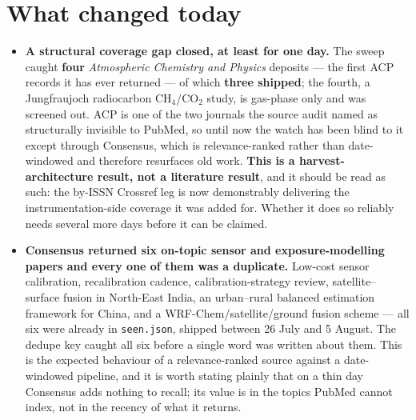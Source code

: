 \documentclass[10pt]{article}
\begin{document}
\section*{\sffamily\bfseries\color{Deep}What changed today}
\vspace{-1.5mm}{\color{Amber}\rule{\linewidth}{1.1pt}}\vspace{2.5mm}

\footnotesize
\begin{itemize}
\item \textbf{A structural coverage gap closed, at least for one day.} The sweep caught
\textbf{four} \textit{Atmospheric Chemistry and Physics} deposits --- the first ACP
records it has ever returned --- of which \textbf{three shipped}; the fourth, a
Jungfraujoch radiocarbon CH$_4$/CO$_2$ study, is gas-phase only and was screened out.
ACP is one of the two journals the source audit named as
structurally invisible to PubMed, so until now the watch has been blind to it except
through Consensus, which is relevance-ranked rather than date-windowed and therefore
resurfaces old work. \textbf{This is a harvest-architecture result, not a literature
result}, and it should be read as such: the by-ISSN Crossref leg is now demonstrably
delivering the instrumentation-side coverage it was added for. Whether it does so
reliably needs several more days before it can be claimed.

\item \textbf{Consensus returned six on-topic sensor and exposure-modelling papers and
every one of them was a duplicate.} Low-cost sensor calibration, recalibration cadence,
calibration-strategy review, satellite--surface fusion in North-East India, an
urban--rural balanced estimation framework for China, and a WRF-Chem/satellite/ground
fusion scheme --- all six were already in \texttt{seen.json}, shipped between 26 July and
5 August. The dedupe key caught all six before a single word was written about them. This
is the expected behaviour of a relevance-ranked source against a date-windowed pipeline,
and it is worth stating plainly that on a thin day Consensus adds nothing to recall; its
value is in the topics PubMed cannot index, not in the recency of what it returns.


\end{itemize}
\end{document}
